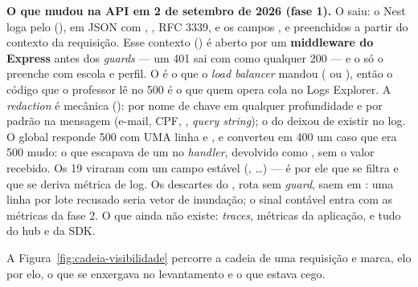 \begin{nota}
\textbf{O que mudou na API em 2 de setembro de 2026 (fase 1).} O
 saiu: o Nest loga pelo 
(), em JSON com ,
,  RFC 3339,  e os campos
,  e 
preenchidos a partir do contexto da requisição. Esse contexto
() é aberto por um \textbf{middleware do
Express} antes dos \emph{guards} --- um 401 sai com  como
qualquer 200 --- e o  só o preenche com escola e
perfil. O  é o  que o \emph{load balancer} mandou
( ou ), então o código que o
professor lê no 500 é o que quem opera cola no Logs Explorer. A
\emph{redaction} é mecânica (): por nome
de chave em qualquer profundidade e por padrão na mensagem (e-mail, CPF,
, \emph{query string}); o  do
 deixou de existir no log. O
 global responde 500  com UMA
linha  e , e converteu em 400 um caso que era 500
mudo: o  que escapava de um  no \emph{handler},
devolvido como , sem o valor recebido. Os 19 
viraram  com um campo  estável
(, \ldots) --- é por
ele que se filtra e que se deriva métrica de log. Os descartes do
, rota sem \emph{guard}, saem em : uma
linha por lote recusado seria vetor de inundação; o sinal contável entra
com as métricas da fase 2. O que ainda não existe: \emph{traces},
métricas da aplicação, e tudo do hub e da SDK.
\end{nota}

A Figura~\ref{fig:cadeia-visibilidade} percorre a cadeia de uma requisição e
marca, elo por elo, o que se enxergava no levantamento e o que estava cego.


